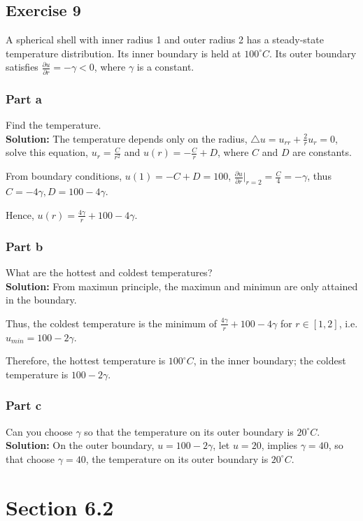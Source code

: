 \documentclass[12pt]{article}%
\begin{document}
    \subsection*{Exercise 9} A spherical shell with inner radius 1 and outer radius 2 has a steady-state temperature distribution. Its inner boundary is held at $100 ^{\circ} C$.
     Its outer boundary satisfies $\frac{\partial u}{\partial r}=-\gamma<0$, where $\gamma$ is a constant.
     \subsubsection*{Part a} Find the temperature.\\
     \textbf{Solution:}
     The temperature depends only on the radius, $\triangle u = u_{rr} +\frac{2}{r}u_{r}=0$, solve this equation, $u_{r}=\frac{C}{r^2}$ and $u(r)=-\frac{C}{r}+D$, where $C$ and $D$ are constants.

     From boundary conditions, $u(1)=-C+D=100$, $\frac{\partial u}{\partial r}|_{r=2}=\frac{C}{4}=-\gamma$, thus $C=-4\gamma, D=100-4\gamma$.

     Hence, $u(r)=\frac{4\gamma}{r}+100-4\gamma$.

     \subsubsection*{Part b} What are the hottest and coldest temperatures?\\
     \textbf{Solution:}
     From maximun principle, the maximun and minimun are only attained in the boundary.

     Thus, the coldest temperature is the minimum of $\frac{4\gamma}{r}+100-4\gamma $ for $r\in[1,2]$, i.e. $u_{min}=100-2\gamma$.

     Therefore, the hottest temperature is $100 ^{\circ} C$, in the inner boundary; the coldest temperature is $100-2\gamma$.

     \subsubsection*{Part c} Can you choose $\gamma$ so that the temperature on its outer boundary is $20 ^{\circ} C$.\\
     \textbf{Solution:}
      On the outer boundary, $u=100-2\gamma$, let $u=20$, implies $\gamma = 40$, so that choose $\gamma = 40$, the temperature on its outer boundary is $20 ^{\circ} C$.


     \section*{Section 6.2}
\end{document}
